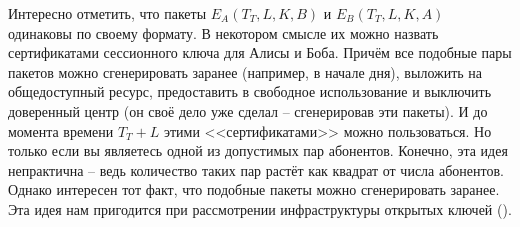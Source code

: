 Интересно отметить, что пакеты $E_A \left( T_T, L, K, B \right)$ и $E_B \left( T_T, L, K, A \right)$ одинаковы по своему формату. В некотором смысле их можно назвать сертификатами сессионного ключа для Алисы и Боба. Причём все подобные пары пакетов можно сгенерировать заранее (например, в начале дня), выложить на общедоступный ресурс, предоставить в свободное использование и выключить доверенный центр (он своё дело уже сделал -- сгенерировав эти пакеты). И до момента времени $T_T + L$ этими <<сертификатами>> можно пользоваться. Но только если вы являетесь одной из допустимых пар абонентов. Конечно, эта идея непрактична -- ведь количество таких пар растёт как квадрат от числа абонентов. Однако интересен тот факт, что подобные пакеты можно сгенерировать заранее. Эта идея нам пригодится при рассмотрении инфраструктуры открытых ключей ().

